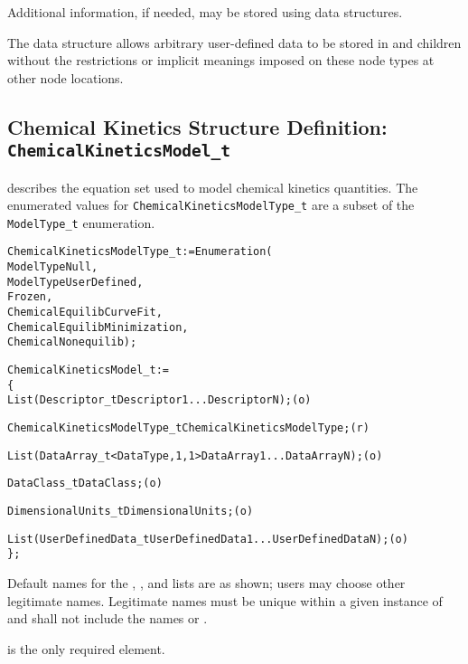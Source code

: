 Additional information, if needed, may be stored using
 data structures.

The  data structure allows arbitrary
user-defined data to be stored in  and
 children without the restrictions or implicit
meanings imposed on these node types at other node locations.

\subsection{Chemical Kinetics Structure Definition: \texttt{ChemicalKineticsModel\_t}}
\label{s:ChemicalKineticsModel}

 describes the equation set used to model
chemical kinetics quantities.
The enumerated values for \texttt{ChemicalKineticsModelType\_t} are a subset of the
\texttt{ModelType\_t} enumeration.
\begin{alltt}
  ChemicalKineticsModelType\_t := Enumeration(
    ModelTypeNull,
    ModelTypeUserDefined,
    Frozen,
    ChemicalEquilibCurveFit,
    ChemicalEquilibMinimization,
    ChemicalNonequilib ) ;
\end{alltt}

\begin{alltt}
  ChemicalKineticsModel\_t :=
    \{
    List( Descriptor\_t Descriptor1 ... DescriptorN ) ;                      (o)

    ChemicalKineticsModelType\_t ChemicalKineticsModelType ;                 (r)
    
    List( DataArray\_t<DataType, 1, 1> DataArray1 ... DataArrayN ) ;         (o)

    DataClass\_t DataClass ;                                                 (o)
                
    DimensionalUnits\_t DimensionalUnits ;                                   (o)

    List( UserDefinedData\_t UserDefinedData1 ... UserDefinedDataN ) ;       (o)
    \} ;
\end{alltt}

\begin{notes}
\item
 Default names for the , , and
 lists are as shown; users may choose other legitimate names.
 Legitimate names must be unique within a given instance of
  and shall not include the names
  or .
\item
  is the only required element.
\end{notes}

